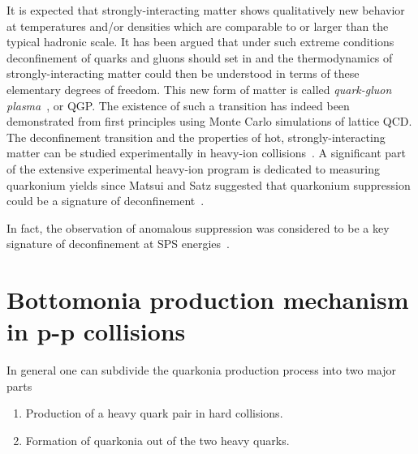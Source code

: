 \documentclass[review]{elsarticle}
\newcommand{\QQbar}{\ensuremath{Q \overline{Q}\xspace}\xspace}
\newcommand{\pp}{{\ensuremath{pp}}\xspace}
\begin{document}
It is expected that strongly-interacting matter shows qualitatively
new behavior at temperatures and/or densities which are
comparable to or larger than the typical hadronic scale.
It has been argued that under such extreme conditions
deconfinement of quarks and gluons should set in and the 
thermodynamics of strongly-interacting matter could then
be understood in terms of these elementary degrees of freedom.
This new form of matter is called
{\em quark-gluon plasma}~\cite{Shuryak:1980tp,Satz:2011wf}, or QGP.
The existence of such a transition has indeed been demonstrated 
from first principles using Monte Carlo simulations of lattice QCD.
The deconfinement transition and the properties of hot, strongly-interacting 
matter can be studied experimentally in heavy-ion collisions~\cite{Satz:2000bn}. 
A significant part of the extensive experimental heavy-ion
program is dedicated to measuring quarkonium yields since Matsui and Satz
suggested that quarkonium suppression could be a signature of 
deconfinement~\cite{Matsui:1986dk}.

In fact, the observation of anomalous suppression was considered to be
a key signature of deconfinement at SPS energies~\cite{Kluberg:2005yh}.






\section{Bottomonia production mechanism in p-p collisions}
\label{sec:Bottomonia_pp_th}


In general one can subdivide the quarkonia production process into two major parts

\begin{enumerate}
\item Production of a heavy quark pair in hard collisions.
\item Formation of quarkonia out of the two heavy quarks.
\end{enumerate}
\end{document}
